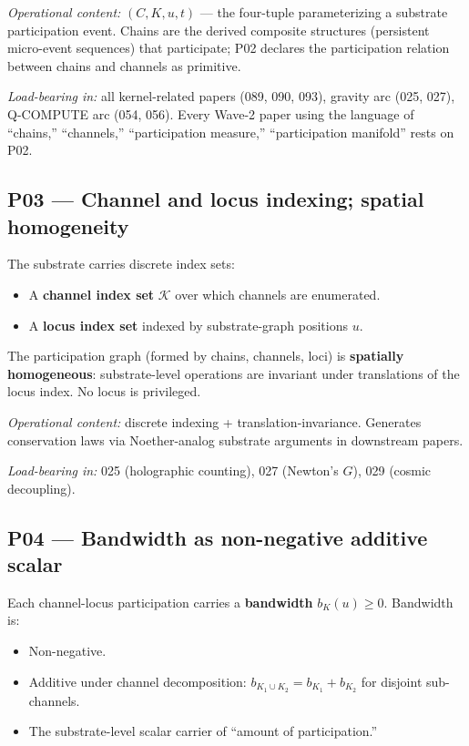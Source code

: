 \documentclass[11pt,a4paper]{article}
\begin{document}
\emph{Operational content:} $(C, K, u, t)$ --- the four-tuple parameterizing a substrate participation event. Chains are the derived composite structures (persistent micro-event sequences) that participate; P02 declares the participation relation between chains and channels as primitive.

\emph{Load-bearing in:} all kernel-related papers (089, 090, 093), gravity arc (025, 027), Q-COMPUTE arc (054, 056). Every Wave-2 paper using the language of ``chains,'' ``channels,'' ``participation measure,'' ``participation manifold'' rests on P02.

\subsection*{P03 --- Channel and locus indexing; spatial homogeneity}

The substrate carries discrete index sets:

\begin{itemize}[noitemsep]
\item A \textbf{channel index set} $\mathcal{K}$ over which channels are enumerated.
\item A \textbf{locus index set} indexed by substrate-graph positions $u$.
\end{itemize}

The participation graph (formed by chains, channels, loci) is \textbf{spatially homogeneous}: substrate-level operations are invariant under translations of the locus index. No locus is privileged.

\emph{Operational content:} discrete indexing + translation-invariance. Generates conservation laws via Noether-analog substrate arguments in downstream papers.

\emph{Load-bearing in:} 025 (holographic counting), 027 (Newton's $G$), 029 (cosmic decoupling).

\subsection*{P04 --- Bandwidth as non-negative additive scalar}

Each channel-locus participation carries a \textbf{bandwidth} $b_K(u) \geq 0$. Bandwidth is:

\begin{itemize}[noitemsep]
\item Non-negative.
\item Additive under channel decomposition: $b_{K_1 \cup K_2} = b_{K_1} + b_{K_2}$ for disjoint sub-channels.
\item The substrate-level scalar carrier of ``amount of participation.''
\end{itemize}
\end{document}
